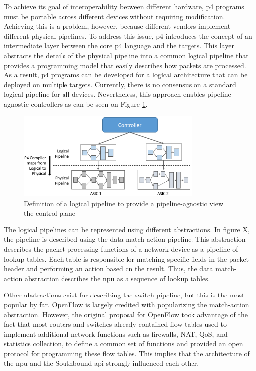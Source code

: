 To achieve its goal of interoperability between different hardware, \gls{p4} programs must be portable across different devices without requiring modification. Achieving this is a problem, however, because different vendors implement different physical pipelines. To address this issue, \gls{p4} introduces the concept of an intermediate layer between the core \gls{p4} language and the targets\cite{hauser_survey_2021}. This layer abstracts the details of the physical pipeline into a common logical pipeline that provides a programming model that easily describes how packets are processed. As a result, \gls{p4} programs can be developed for a logical architecture that can be deployed on multiple targets. Currently, there is no consensus on a standard logical pipeline for all devices. Nevertheless, this approach enables pipeline-agnostic controllers as can be seen on Figure \ref{fig:pipeline_abstraction}. 

\begin{figure}
	\centering
	\includegraphics[width=0.8\textwidth]{Chapters/Figures/SDNs/pipeline_abstraction.png}
	\caption{Definition of a logical pipeline to provide a pipeline-agnostic view the control plane\cite{peterson_software-defined_2021}}
	\label{fig:pipeline_abstraction}
\end{figure}


The logical pipelines can be represented using different abstractions. In figure X, the pipeline is described using the data match-action pipeline. This abstraction describes the packet processing functions of a network device as a pipeline of lookup tables. Each table is responsible for matching specific fields in the packet header and performing an action based on the result\cite{bifulco_survey_2018}\cite{kreutz_software-defined_2015}. Thus, the data match-action abstraction describes the \gls{npu} as a sequence of lookup tables. 

Other abstractions exist for describing the switch pipeline, but this is the most popular by far. OpenFlow is largely credited with popularizing the match-action abstraction\cite{bifulco_survey_2018}. However, the original proposal for OpenFlow took advantage of the fact that most routers and switches already contained flow tables used to implement additional network functions such as firewalls, NAT, QoS, and statistics collection, to define a common set of functions and provided an open protocol for programming these flow tables\cite{mckeown_openflow_2008}. This implies that the architecture of the \gls{npu} and the Southbound \gls{api} strongly influenced each other.

